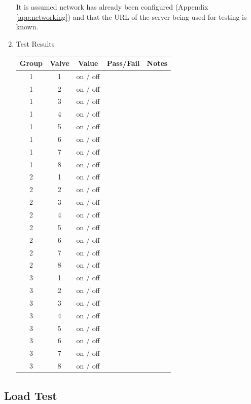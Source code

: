 \documentclass{article}
\begin{document}
\begin{enumerate}
It is assumed network has already been configured
(Appendix \ref{app:networking}) and that the URL of the server being
used for testing is known.

\pagebreak
\item Test Results \\
	\vspace{1em}
	\begin{tabular}{|c|c|c|c|c|}
		\hline
		Group & Valve & Value & Pass/Fail & Notes \\
		\hline
		1 & 1 & on / off && \hspace{20em} \\
		\hline
		1 & 2 & on / off && \\
		\hline
		1 & 3 & on / off && \\
		\hline
		1 & 4 & on / off && \\
		\hline
		1 & 5 & on / off && \\
		\hline
		1 & 6 & on / off && \\
		\hline
		1 & 7 & on / off && \\
		\hline
		1 & 8 & on / off && \\
		\hline
		\hline
		2 & 1 & on / off && \\
		\hline
		2 & 2 & on / off && \\
		\hline
		2 & 3 & on / off && \\
		\hline
		2 & 4 & on / off && \\
		\hline
		2 & 5 & on / off && \\
		\hline
		2 & 6 & on / off && \\
		\hline
		2 & 7 & on / off && \\
		\hline
		2 & 8 & on / off && \\
		\hline
		\hline
		3 & 1 & on / off && \\
		\hline
		3 & 2 & on / off && \\
		\hline
		3 & 3 & on / off && \\
		\hline
		3 & 4 & on / off && \\
		\hline
		3 & 5 & on / off && \\
		\hline
		3 & 6 & on / off && \\
		\hline
		3 & 7 & on / off && \\
		\hline
		3 & 8 & on / off && \\
		\hline
	\end{tabular}
\end{enumerate}

\clearpage
\subsection{Load Test}
\end{document}
